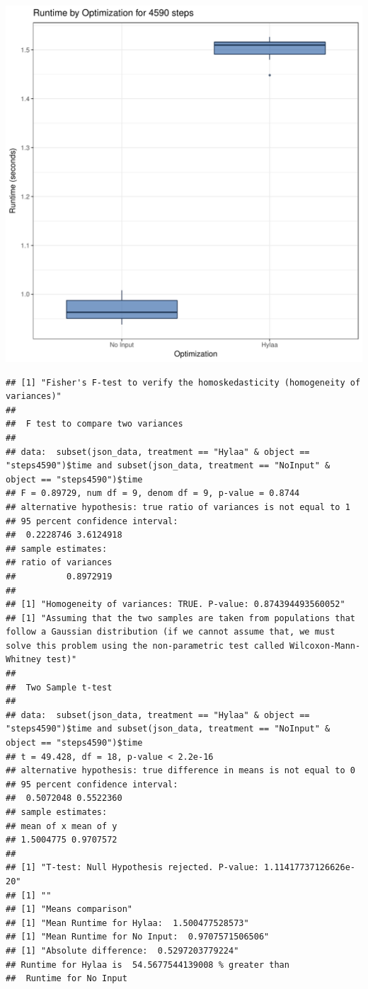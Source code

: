 \documentclass{article}\usepackage[]{graphicx}\usepackage[]{color}
\makeatletter
\def\maxwidth{ %
  \ifdim\Gin@nat@width>\linewidth
    \linewidth
  \else
    \Gin@nat@width
  \fi
}
\newenvironment{kframe}{%
 \def\at@end@of@kframe{}%
 \ifinner\ifhmode%
  \def\at@end@of@kframe{\end{minipage}}%
  \begin{minipage}{\columnwidth}%
 \fi\fi%
 \def\FrameCommand##1{\hskip\@totalleftmargin \hskip-\fboxsep
 \colorbox{shadecolor}{##1}\hskip-\fboxsep
     \hskip-\linewidth \hskip-\@totalleftmargin \hskip\columnwidth}%
 \MakeFramed {\advance\hsize-\width
   \@totalleftmargin\z@ \linewidth\hsize
   \@setminipage}}%
 {\par\unskip\endMakeFramed%
 \at@end@of@kframe}
\newenvironment{knitrout}{}{} %
\makeatother
\begin{document}
\begin{knitrout}
\color{fgcolor}
\includegraphics[width=\maxwidth]{figure/RH4_steps4590-1} 
\begin{kframe}\begin{verbatim}
## [1] "Fisher's F-test to verify the homoskedasticity (homogeneity of variances)"
## 
## 	F test to compare two variances
## 
## data:  subset(json_data, treatment == "Hylaa" & object == "steps4590")$time and subset(json_data, treatment == "NoInput" & object == "steps4590")$time
## F = 0.89729, num df = 9, denom df = 9, p-value = 0.8744
## alternative hypothesis: true ratio of variances is not equal to 1
## 95 percent confidence interval:
##  0.2228746 3.6124918
## sample estimates:
## ratio of variances 
##          0.8972919 
## 
## [1] "Homogeneity of variances: TRUE. P-value: 0.874394493560052"
## [1] "Assuming that the two samples are taken from populations that follow a Gaussian distribution (if we cannot assume that, we must solve this problem using the non-parametric test called Wilcoxon-Mann-Whitney test)"
## 
## 	Two Sample t-test
## 
## data:  subset(json_data, treatment == "Hylaa" & object == "steps4590")$time and subset(json_data, treatment == "NoInput" & object == "steps4590")$time
## t = 49.428, df = 18, p-value < 2.2e-16
## alternative hypothesis: true difference in means is not equal to 0
## 95 percent confidence interval:
##  0.5072048 0.5522360
## sample estimates:
## mean of x mean of y 
## 1.5004775 0.9707572 
## 
## [1] "T-test: Null Hypothesis rejected. P-value: 1.11417737126626e-20"
## [1] ""
## [1] "Means comparison"
## [1] "Mean Runtime for Hylaa:  1.500477528573"
## [1] "Mean Runtime for No Input:  0.9707571506506"
## [1] "Absolute difference:  0.5297203779224"
## Runtime for Hylaa is  54.5677544139008 % greater than 
##  Runtime for No Input
\end{verbatim}
\end{kframe}
\end{knitrout}
\end{document}
